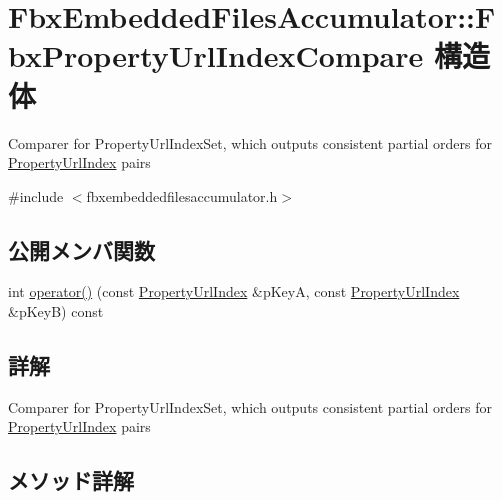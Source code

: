 \hypertarget{struct_fbx_embedded_files_accumulator_1_1_fbx_property_url_index_compare}{}\section{Fbx\+Embedded\+Files\+Accumulator\+:\+:Fbx\+Property\+Url\+Index\+Compare 構造体}
\label{struct_fbx_embedded_files_accumulator_1_1_fbx_property_url_index_compare}


Comparer for Property\+Url\+Index\+Set, which outputs consistent partial orders for \hyperlink{struct_fbx_embedded_files_accumulator_1_1_property_url_index}{Property\+Url\+Index} pairs  




{\ttfamily \#include $<$fbxembeddedfilesaccumulator.\+h$>$}

\subsection*{公開メンバ関数}
\begin{DoxyCompactItemize}
\item 
int \hyperlink{struct_fbx_embedded_files_accumulator_1_1_fbx_property_url_index_compare_a0b2f77a9b93ac4d2e435f5b8b15078a9}{operator()} (const \hyperlink{struct_fbx_embedded_files_accumulator_1_1_property_url_index}{Property\+Url\+Index} \&p\+KeyA, const \hyperlink{struct_fbx_embedded_files_accumulator_1_1_property_url_index}{Property\+Url\+Index} \&p\+KeyB) const
\end{DoxyCompactItemize}


\subsection{詳解}
Comparer for Property\+Url\+Index\+Set, which outputs consistent partial orders for \hyperlink{struct_fbx_embedded_files_accumulator_1_1_property_url_index}{Property\+Url\+Index} pairs 

\subsection{メソッド詳解}
\mbox{\label{struct_fbx_embedded_files_accumulator_1_1_fbx_property_url_index_compare_a0b2f77a9b93ac4d2e435f5b8b15078a9}} 
